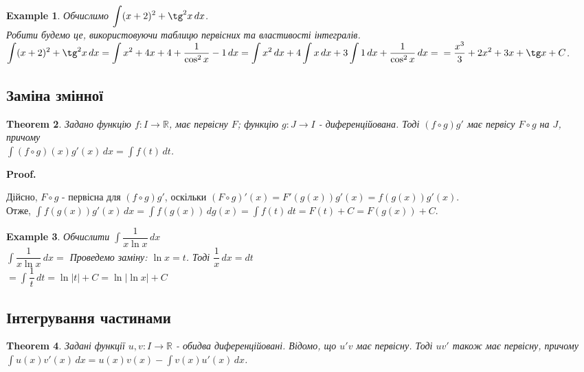 \documentclass[a4paper, 10pt]{article}
\makeatletter
\def\huge{\displaystyle}
\def\qed{$\blacksquare$}
\theoremstyle{theoremdd}
\newtheorem{theorem}{Theorem}[subsection]
\theoremstyle{theoremdd}
\theoremstyle{theoremdd}
\theoremstyle{theoremdd}
\theoremstyle{theoremdd}
\newtheorem{example}[theorem]{Example}
\theoremstyle{theoremdd}
\theoremstyle{theoremdd}
\theoremstyle{theoremdd}
\theoremstyle{theoremdd}
\renewenvironment{proof}[1][Proof.\\]{\par
\pushQED{\hfill \qed}%
\normalfont \topsep6\p@\@plus6\p@\relax
\trivlist
\item\relax
{\bfseries
#1\@addpunct{.}}\hspace\labelsep\ignorespaces
}{%
\popQED\endtrivlist\@endpefalse
}
\makeatother
\begin{document}
\begin{example}
Обчислимо $\huge\int (x+2)^2 + \tg^2 x\,dx$.\\
Робити будемо це, використовуючи таблицю первісних та властивості інтегралів.\\
$\huge\int (x+2)^2 + \tg^2 x\,dx = \int x^2 + 4x + 4 + \dfrac{1}{\cos^2 x} - 1\,dx = \int x^2\,dx + 4 \int x\,dx + 3 \int 1\,dx + \dfrac{1}{\cos^2 x}\,dx = \\ = \dfrac{x^3}{3} + 2x^2 + 3x + \tg x + C$.
\end{example}

\subsection{Заміна змінної}
\begin{theorem} Задано функцію $f: I \to \mathbb{R}$, має первісну $F$; функцію $g: J \to I$ - диференційована. Тоді $(f \circ g) g'$ має первісу $F \circ g$ на $J$, причому \\
$\huge \int (f \circ g)(x) g'(x)\,dx = \int f(t)\,dt$.
\end{theorem}

\begin{proof}
Дійсно, $F \circ g$ - первісна для $(f \circ g) g'$, оскільки $(F \circ g)' (x) = F'(g(x)) g'(x) = f(g(x))g'(x)$. \\
Отже, $\huge \int f(g(x)) g'(x)\,dx = \int f(g(x)) \,dg(x) = \int f(t) \,dt = F(t) + C = F(g(x)) + C$.
\end{proof}

\begin{example} Обчислити $\huge \int \dfrac{1}{x \ln x} \,dx$\\
$\huge \int \dfrac{1}{x \ln x} \,dx \boxed{=} $ \hspace{2cm} Проведемо заміну: $\ln x = t$. Тоді $\dfrac{1}{x}\,dx = dt$\\
$\boxed{=} \huge \int \dfrac{1}{t}\,dt = \ln |t| + C = \ln |\ln x| + C$
\end{example}

\subsection{Інтегрування частинами}
\begin{theorem}
Задані функції $u,v: I \to \mathbb{R}$ - обидва диференційовані. Відомо, що $u'v$ має первісну. Тоді $uv'$ також має первісну, причому\\
$\huge\int u(x)v'(x)\,dx = u(x)v(x) - \int v(x)u'(x)\,dx$.
\end{theorem}
\end{document}
